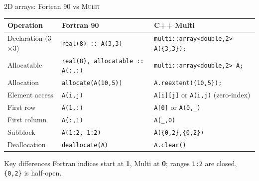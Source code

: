 \begin{frame}[label=fortran-comparison,fragile]{2D arrays: Fortran 90 vs \textsc{Multi}}
\small
\begin{tabular}{@{}lll@{}}
\hline
\textbf{Operation}         & \textbf{Fortran 90}                  & \textbf{C++ Multi} \\
\hline
Declaration (3$\times$3)   & \lstinline|real(8) :: A(3,3)|        & \lstinline|multi::array<double,2> A({3,3});| \\
Allocatable                & \lstinline|real(8), allocatable :: A(:,:)| & \lstinline|multi::array<double,2> A;| \\
Allocation                 & \lstinline|allocate(A(10,5))|        & \lstinline|A.reextent({10,5});| \\
Element access             & \lstinline|A(i,j)|                   & \lstinline|A[i][j]| or \lstinline|A(i,j)| (zero-index)\\
First row                  & \lstinline|A(1,:)|                   & \lstinline|A[0]| or \lstinline|A(0,_)| \\
First column               & \lstinline|A(:,1)|                   & \lstinline|A(_,0)| \\
Subblock                   & \lstinline|A(1:2, 1:2)|              & \lstinline|A({0,2},{0,2})| \\
Deallocation               & \lstinline|deallocate(A)|            & \lstinline|A.clear()| \\
\hline
\end{tabular}

\vspace{0.5em}
\begin{alertblock}{Key differences}
  Fortran indices start at \textbf{1}, Multi at \textbf{0}; ranges \lstinline|1:2| are closed, \lstinline|{0,2}| is half-open.
\end{alertblock}
\end{frame}

